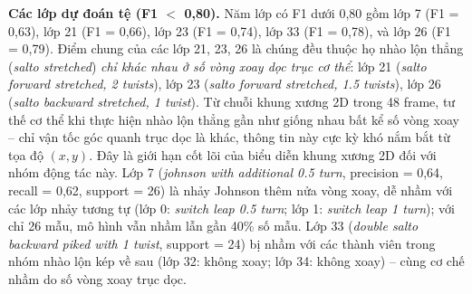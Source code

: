 \documentclass[conference]{IEEEtran}
\begin{document}
\textbf{Các lớp dự đoán tệ (F1 $<$ 0,80).}
Năm lớp có F1 dưới 0,80 gồm lớp 7 (F1 = 0,63), lớp 21 (F1 = 0,66),
lớp 23 (F1 = 0,74), lớp 33 (F1 = 0,78), và lớp 26 (F1 = 0,79).
Điểm chung của các lớp 21, 23, 26 là chúng đều thuộc họ nhào lộn thẳng
(\textit{salto stretched}) \textit{chỉ khác nhau ở số vòng xoay dọc trục
cơ thể}: lớp 21 (\textit{salto forward stretched, 2 twists}), lớp 23
(\textit{salto forward stretched, 1.5 twists}), lớp 26 (\textit{salto
backward stretched, 1 twist}). Từ chuỗi khung xương 2D trong 48 frame,
tư thế cơ thể khi thực hiện nhào lộn thẳng gần như giống nhau bất kể số
vòng xoay -- chỉ vận tốc góc quanh trục dọc là khác, thông tin này cực
kỳ khó nắm bắt từ tọa độ $(x,y)$. Đây là giới hạn cốt lõi của biểu diễn
khung xương 2D đối với nhóm động tác này. Lớp 7 (\textit{johnson with
additional 0.5 turn}, precision = 0,64, recall = 0,62, support = 26) là
nhảy Johnson thêm nửa vòng xoay, dễ nhầm với các lớp nhảy tương tự (lớp
0: \textit{switch leap 0.5 turn}; lớp 1: \textit{switch leap 1 turn});
với chỉ 26 mẫu, mô hình vẫn nhầm lẫn gần 40\% số mẫu. Lớp 33
(\textit{double salto backward piked with 1 twist}, support = 24) bị nhầm
với các thành viên trong nhóm nhào lộn kép về sau (lớp 32: không xoay;
lớp 34: không xoay) -- cùng cơ chế nhầm do số vòng xoay trục dọc.

\end{document}
